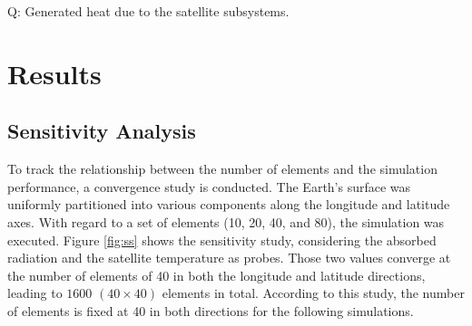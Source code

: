 \documentclass[11pt]{article}
\begin{document}
Q: Generated heat due to the satellite subsystems.


 
\newpage
\section{Results} %
\indent

\subsection{Sensitivity Analysis}

To track the relationship between the number of elements and the simulation performance, a convergence study is conducted. The Earth's surface was uniformly partitioned into various components along the longitude and latitude axes. With regard to a set of elements (10, 20, 40, and 80), the simulation was executed. Figure \ref{fig:ss} shows the sensitivity study, considering the absorbed radiation and the satellite temperature as probes. Those two values converge at the number of elements of 40 in both the longitude and latitude directions, leading to $1600$ $(40\times40)$ elements in total. According to this study, the number of elements is fixed at 40 in both directions for the following simulations.
\end{document}
